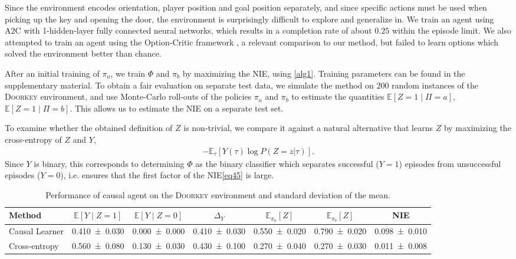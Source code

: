 \documentclass[letterpaper]{article} %
\newcommand{\EE}{\mathbb{E}}
\newcommand{\NIE}{\textrm{NIE}\xspace}
\newcommand{\doorkey}{\textsc{Doorkey}\xspace}
\begin{document}
	Since the environment encodes orientation, player position and goal position separately, and since specific actions must be used when picking up the key and opening the door, the environment is surprisingly difficult to explore and generalize in. We train an agent using A2C \citep{mnih2016asynchronous} with 1-hidden-layer fully connected neural networks, which results in a completion rate of about $0.25$ within the episode limit. We also attempted to train an agent using the Option-Critic framework \citep{bacon2017option}, a relevant comparison to our method, but failed to learn options which solved the environment better than chance.


	After an initial training of $\pi_a$, we train $\Phi$ and $\pi_b$ by maximizing the \NIE, using \cref{alg1}. Training parameters can be found in the supplementary material. To obtain a fair evaluation on separate test data, we simulate the method on $200$ random instances of the \doorkey  environment, and use Monte-Carlo roll-outs of the policies $\pi_a$ and $\pi_b$ to estimate the quantities $\EE \left[Z=1 \mid \Pi = a \right]$, $\EE \left[Z=1 \mid \Pi = b \right]$. This allows us to estimate the \NIE on a separate test set.

	To examine whether the obtained definition of $Z$ is non-trivial, we compare it against a natural alternative that learns $Z$ by maximizing the cross-entropy of $Z$ and $Y$, %
	\begin{align}
		-\EE_\tau\left[Y(\tau) \log P(Z=z|\tau)\right]. \label{eq46}
	\end{align}
	Since $Y$ is binary, this corresponds to determining $\Phi$ as the binary classifier which
	separates successful ($Y=1$) episodes from unsuccessful episodes ($Y=0$), i.e. ensures that the first factor of the \NIE \cref{eq45} is large.

	\begin{table}[t]
		\centering
\begin{tabular}{ lcccccc }
	\toprule Method
	&  $\mathbb{E}[Y\mid Z=1]$
	&  $\mathbb{E}[Y\mid Z=0]$
	&  $\Delta_Y$
	&  $\mathbb{E}_{\pi_a}[Z]$
	&  $\mathbb{E}_{\pi_b}[Z]$
	&  NIE
	\\ \midrule Causal Learner
	&  \SI{0.410\pm 0.030}{}
	&  \SI{0.000\pm 0.000}{}
	&  \SI{0.410\pm 0.030}{}
	&  \SI{0.550\pm 0.020}{}
	&  \SI{0.790\pm 0.020}{}
	&  \SI{0.098\pm 0.010}{}
	\\  Cross-entropy
	&  \SI{0.560\pm 0.080}{}
	&  \SI{0.130\pm 0.030}{}
	&  \SI{0.430\pm 0.100}{}
	&  \SI{0.270\pm 0.040}{}
	&  \SI{0.270\pm 0.030}{}
	&  \SI{0.011\pm 0.008}{}
	\\ \bottomrule\end{tabular}
		\caption{Performance of causal agent on the \doorkey environment and standard deviation of the mean.}\label{tbl_12}
	\end{table}
\end{document}
